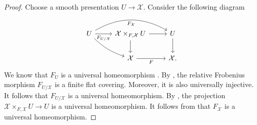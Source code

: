 \documentclass[11pt]{amsart}
\theoremstyle{plain}
\theoremstyle{definition}
\numberwithin{equation}{section}
\numberwithin{theorem}{section}
\begin{document}
\begin{proof}
    Choose a smooth presentation $U\to\mathcal{X}$. Consider the following diagram
    \begin{displaymath}
        \begin{tikzcd}
            {U} & {\mathcal{X}\times_{F,\mathcal{X}} U} & {U} \\
            & {\mathcal{X}} & {\mathcal{X}.}
            \arrow["{F_{U/\mathcal{X}}}"', from=1-1, to=1-2]
            \arrow["F_{\mathcal{X}}"', bend right =-30pt, from=1-1, to=1-3]
            \arrow[bend right =12pt, from=1-1, to=2-2]
            \arrow[from=1-2, to=1-3]
            \arrow[from=1-2, to=2-2]
            \arrow[from=1-3, to=2-3]
            \arrow["F"', from=2-2, to=2-3]
        \end{tikzcd}
    \end{displaymath}
    We know that $F_U$ is a universal homeomorphism \cite[\href{https://stacks.math.columbia.edu/tag/0CC8}{Tag 0CC8}]{stacks-project}. 
    By \cite[Lemma 3.2.4]{Olsson:2007}, the relative Frobenius morphism $F_{U/\mathcal{X}}$ is a finite flat covering. 
    Moreover, it is also universally injective. It follows that $F_{U/\mathcal{X}}$ is a universal homeomorphism. 
    By \cite[\href{https://stacks.math.columbia.edu/tag/0H2M}{Tag 0H2M}]{stacks-project}, the projection $\mathcal{X}\times_{F,\mathcal{X}} U\to U$ is a universal homeomorphism.
    It follows from \cite[\href{https://stacks.math.columbia.edu/tag/0DTQ}{Tag 0DTQ}]{stacks-project} that $F_\mathcal{X}$ is a universal homeomorphism.
    

\end{proof}
\end{document}
